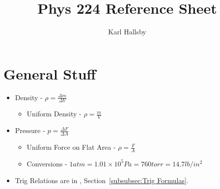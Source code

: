 \documentclass[10pt,letterpaper,final,twoside,notitlepage]{article}
\author{Karl Hallsby}
\title{Phys 224 Reference Sheet}
\numberwithin{equation}{section} %
\theoremstyle{definition}
\theoremstyle{remark}
\begin{document}
	\tableofcontents
	\newpage
	
\section{General Stuff} \label{sec:General}
	\begin{itemize}[noitemsep]
		\item Density - $\rho = \frac{\Delta m}{\Delta V}$
			\begin{itemize}
				\item Uniform Density - $\rho = \frac{m}{V}$
			\end{itemize}
		
		\item Pressure - $p = \frac{\Delta F}{\Delta A}$
			\begin{itemize}
				\item Uniform Force on Flat Area - $\rho = \frac{F}{A}$
				\item Conversions - $1 atm = 1.01 \times 10^5 Pa = 760 torr = 14.7 lb/in^2$
			\end{itemize}
		\item Trig Relations are in , Section~\ref{subsubsec:Trig Formulas}.
	\end{itemize}















\appendix
{}




\end{document}
